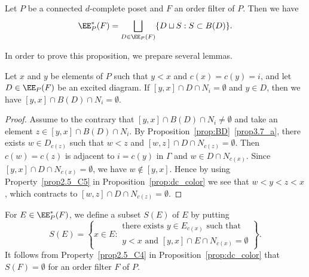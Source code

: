 \begin{prop}
\label{prop:E*}
Let $P$ be a connected $d$-complete poset and $F$ an order filter of $P$.
Then we have
\begin{equation}
\label{eq:E*}
\EE^*_P(F) = \bigsqcup_{D \in \EE_P(F)} \{ D \sqcup S : S \subset B(D) \}.
\end{equation}
\end{prop}

In order to prove this proposition, we prepare several lemmas.

\begin{lemm}
\label{lem:interval_BD}
Let $x$ and $y$ be elements of $P$ such that $y<x$ and $c(x) = c(y) = i$, 
and let $D\in \EE_P(F)$ be an excited diagram.
If $[y,x] \cap D \cap N_i = \emptyset$ and $y \in D$, 
then we have $[y,x] \cap B(D) \cap N_i = \emptyset$.
\end{lemm}

\begin{proof}
Assume to the contrary that $[y,x] \cap B(D) \cap N_i \neq \emptyset$ 
and take an element $z \in [y,x] \cap B(D) \cap N_i$.
By Proposition~\ref{prop:BD}~\ref{prop3.7_a}, there exists $w \in D_{c(z)}$ such that 
$w < z$ and $[w,z] \cap D \cap N_{c(z)} = \emptyset$.
Then $c(w) = c(z)$ is adjacent to $i = c(y)$ in $\Gamma$ and $w \in D \cap N_{c(x)}$.
Since $[y,x] \cap D \cap N_{c(x)} = \emptyset$, we have $w \not\in [y,x]$.
Hence by using Property~\ref{prop2.5_C5} in Proposition~\ref{prop:dc_color} 
we see that $w < y < z < x$, which contracts to $[w,z] \cap D \cap N_{c(z)} = \emptyset$.
\end{proof}

For $E \in \EE^*_P(F)$, we define a subset $S(E)$ of $E$ by putting
\begin{equation}
\label{eq:def_SE}
S(E)
 = 
\left\{
x \in E :
\begin{matrix}
\text{there exists $y \in E_{c(x)}$ such that } \\
\text{$y<x$ and $[y,x] \cap E \cap N_{c(x)} = \emptyset$}
\end{matrix}
\right\}.
\end{equation}
It follows from Property~\ref{prop2.5_C4} in Proposition~\ref{prop:dc_color} that $S(F) = \emptyset$ 
for an order filter $F$ of $P$.

